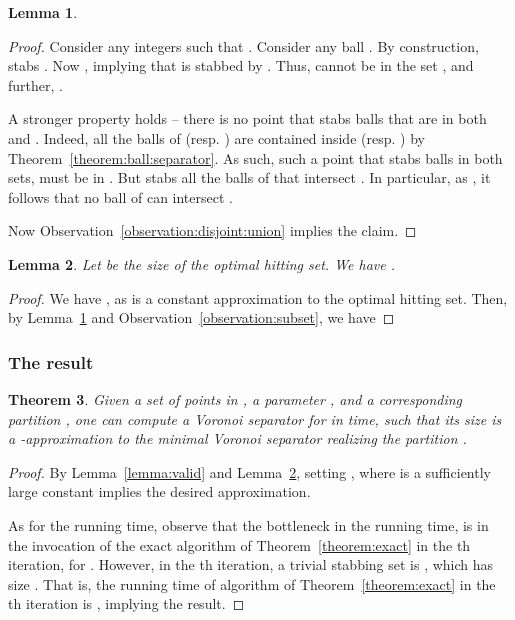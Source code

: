 \InSubmitVer{\documentclass[11pt]{article}}
\numberwithin{figure}{section}
\numberwithin{table}{section}
\numberwithin{equation}{section}
\newtheorem{theorem}{Theorem}[section] \newtheorem{lemma}[theorem]{Lemma}
\newcommand{\lemlab}[1]{\label{lemma:#1}}
\newcommand{\lemref}[1]{Lemma~\ref{lemma:#1}}
\newcommand{\obsref}[1]{Observation~\ref{observation:#1}}
\newcommand{\thmref}[1]{Theorem~\ref{theorem:#1}}
\renewcommand{\th}{\si{th}\xspace}
\begin{document}
\begin{lemma}
    \lemlab{geometrically:disjoint}
\end{lemma}

\begin{proof}
    Consider any integers  such that .  Consider
    any ball . By construction, 
    stabs . Now , implying that  is stabbed by
    . Thus,  cannot be in the set ,
    and further, .
    
    A stronger property holds -- there is no point that stabs balls
    that are in both  and . Indeed, all the
    balls of  (resp.  ) are contained inside
     (resp. ) by \thmref{ball:separator}. As
    such, such a point  that stabs balls in both sets, must be
    in .  But  stabs all the
    balls of  that intersect . In particular, as
    , it follows that no ball of
     can intersect .
    
    Now \obsref{disjoint:union} implies the claim.
\end{proof}

\begin{lemma}
    \lemlab{approx}Let  be the size of the optimal hitting set.  We have
    .
\end{lemma}

\begin{proof}
    We have , as 
    is a constant approximation to the optimal hitting set. Then, by
    \lemref{geometrically:disjoint} and \obsref{subset}, we have
    
\end{proof}


\subsubsection{The result}

\begin{theorem}
    Given a set  of  points in , a parameter
    , and a corresponding partition ,
    one can compute a Voronoi separator for  in
     time, such that its size is a
    -approximation to the minimal Voronoi separator
    realizing the partition .
\end{theorem}

\begin{proof}
    By \lemref{valid} and \lemref{approx}, setting ,
    where  is a sufficiently large constant implies the desired
    approximation.
    
    As for the running time, observe that the bottleneck in the
    running time, is in the invocation of the exact algorithm of
    \thmref{exact} in the \th iteration, for . However, in the \th iteration, a trivial stabbing set is
    , which has size . That is, the running time of
    algorithm of \thmref{exact} in the \th iteration is ,
    implying the result.
\end{proof}
\end{document}
